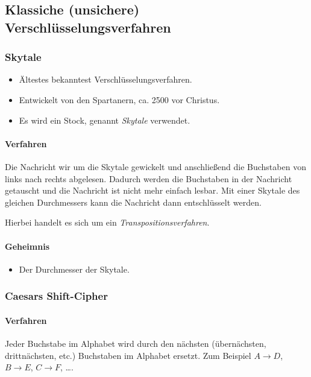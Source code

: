 \documentclass[a4paper, 11pt, accentcolor = tud3b]{tudreport}
\begin{document}
            \subsection{Klassiche (unsichere) Verschlüsselungsverfahren}
                \subsubsection{Skytale} %
                    \begin{itemize}
                    	\item Ältestes bekanntest Verschlüsselungsverfahren.
                    	\item Entwickelt von den Spartanern, ca. 2500 vor Christus.
                    	\item Es wird ein Stock, genannt \textit{Skytale} verwendet.
                    \end{itemize}
                
	                \paragraph{Verfahren}
		                Die Nachricht wir um die Skytale gewickelt und anschließend die Buchstaben von links nach rechts abgelesen. Dadurch werden die Buchstaben in der Nachricht getauscht und die Nachricht ist nicht mehr einfach lesbar. Mit einer Skytale des gleichen Durchmessers kann die Nachricht dann entschlüsselt werden.
		                
		                Hierbei handelt es sich um ein \textit{Transpositionsverfahren}.
	                
	                \paragraph{Geheimnis}
		                \begin{itemize}
		                	\item Der Durchmesser der Skytale.
		                \end{itemize}

                \subsubsection{Caesars Shift-Cipher}
                    \paragraph{Verfahren}
	                    Jeder Buchstabe im Alphabet wird durch den nächsten (übernächsten, drittnächsten, etc.) Buchstaben im Alphabet ersetzt. Zum Beispiel \( A \rightarrow D \), \( B \rightarrow E \), \( C \rightarrow F \), \dots.
	                    
\end{document}
